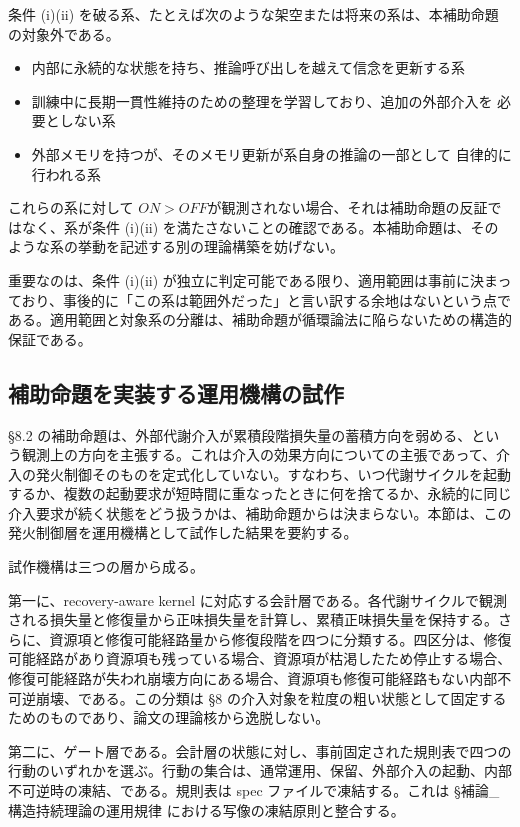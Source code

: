 \documentclass[12pt,a4paper]{article}
\begin{document}
条件 (i)(ii) を破る系、たとえば次のような架空または将来の系は、本補助命題の対象外である。

\begin{itemize}
\tightlist
\item
  内部に永続的な状態を持ち、推論呼び出しを越えて信念を更新する系
\item
  訓練中に長期一貫性維持のための整理を学習しており、追加の外部介入を 必要としない系
\item
  外部メモリを持つが、そのメモリ更新が系自身の推論の一部として 自律的に行われる系
\end{itemize}

これらの系に対して \(ON > OFF\)が観測されない場合、それは補助命題の反証ではなく、系が条件 (i)(ii) を満たさないことの確認である。本補助命題は、そのような系の挙動を記述する別の理論構築を妨げない。

重要なのは、条件 (i)(ii) が独立に判定可能である限り、適用範囲は事前に決まっており、事後的に「この系は範囲外だった」と言い訳する余地はないという点である。適用範囲と対象系の分離は、補助命題が循環論法に陥らないための構造的保証である。

\subsection{補助命題を実装する運用機構の試作}\label{ux88dcux52a9ux547dux984cux3092ux5b9fux88c5ux3059ux308bux904bux7528ux6a5fux69cbux306eux8a66ux4f5c}

§8.2 の補助命題は、外部代謝介入が累積段階損失量の蓄積方向を弱める、という観測上の方向を主張する。これは介入の効果方向についての主張であって、介入の発火制御そのものを定式化していない。すなわち、いつ代謝サイクルを起動するか、複数の起動要求が短時間に重なったときに何を捨てるか、永続的に同じ介入要求が続く状態をどう扱うかは、補助命題からは決まらない。本節は、この発火制御層を運用機構として試作した結果を要約する。

試作機構は三つの層から成る。

第一に、recovery-aware kernel に対応する会計層である。各代謝サイクルで観測される損失量と修復量から正味損失量を計算し、累積正味損失量を保持する。さらに、資源項と修復可能経路量から修復段階を四つに分類する。四区分は、修復可能経路があり資源項も残っている場合、資源項が枯渇したため停止する場合、修復可能経路が失われ崩壊方向にある場合、資源項も修復可能経路もない内部不可逆崩壊、である。この分類は §8 の介入対象を粒度の粗い状態として固定するためのものであり、論文の理論核から逸脱しない。

第二に、ゲート層である。会計層の状態に対し、事前固定された規則表で四つの行動のいずれかを選ぶ。行動の集合は、通常運用、保留、外部介入の起動、内部不可逆時の凍結、である。規則表は spec ファイルで凍結する。これは §補論\_構造持続理論の運用規律 における写像の凍結原則と整合する。
\end{document}
